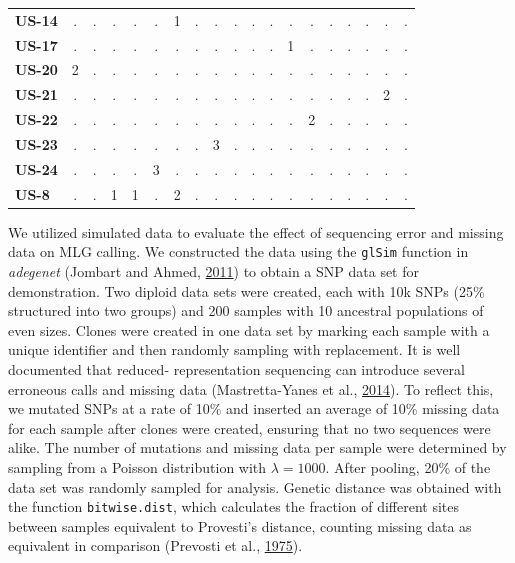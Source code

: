 \documentclass[double,12pt]{beavtex}
\begin{document}
\begin{table}
\begin{tabular}{l|cccccccccccccccccc}
    \textbf{US-14} & . & . & . & . & . & 1 & . & . & . & . & . & . & . & . & . & . & . & . \\ 
    \textbf{US-17} & . & . & . & . & . & . & . & . & . & . & . & 1 & . & . & . & . & . & . \\ 
    \textbf{US-20} & 2 & . & . & . & . & . & . & . & . & . & . & . & . & . & . & . & . & . \\ 
    \textbf{US-21} & . & . & . & . & . & . & . & . & . & . & . & . & . & . & . & . & 2 & . \\ 
    \textbf{US-22} & . & . & . & . & . & . & . & . & . & . & . & . & 2 & . & . & . & . & . \\ 
    \textbf{US-23} & . & . & . & . & . & . & . & 3 & . & . & . & . & . & . & . & . & . & . \\ 
    \textbf{US-24} & . & . & . & . & 3 & . & . & . & . & . & . & . & . & . & . & . & . & . \\ 
    \textbf{US-8} & . & . & 1 & 1 & . & 2 & . & . & . & . & . & . & . & . & . & . & . & . \\ 
     \bottomrule
  \end{tabular}
  \end{table}\newpage
  
  We utilized simulated data to evaluate the effect of sequencing error
  and missing data on MLG calling. We constructed the data using the
  \texttt{glSim} function in \emph{adegenet} (Jombart and Ahmed,
  \protect\hyperlink{ref-jombart2011adegenet}{2011}) to obtain a SNP data
  set for demonstration. Two diploid data sets were created, each with 10k
  SNPs (25\% structured into two groups) and 200 samples with 10 ancestral
  populations of even sizes. Clones were created in one data set by
  marking each sample with a unique identifier and then randomly sampling
  with replacement. It is well documented that reduced- representation
  sequencing can introduce several erroneous calls and missing data
  (Mastretta-Yanes et al.,
  \protect\hyperlink{ref-mastretta2015restriction}{2014}). To reflect
  this, we mutated SNPs at a rate of 10\% and inserted an average of 10\%
  missing data for each sample after clones were created, ensuring that no
  two sequences were alike. The number of mutations and missing data per
  sample were determined by sampling from a Poisson distribution with
  \(\lambda = 1000\). After pooling, 20\% of the data set was randomly
  sampled for analysis. Genetic distance was obtained with the function
  \texttt{bitwise.dist}, which calculates the fraction of different sites
  between samples equivalent to Provesti's distance, counting missing data
  as equivalent in comparison (Prevosti et al.,
  \protect\hyperlink{ref-prevosti1975distances}{1975}).
  
\end{document}
